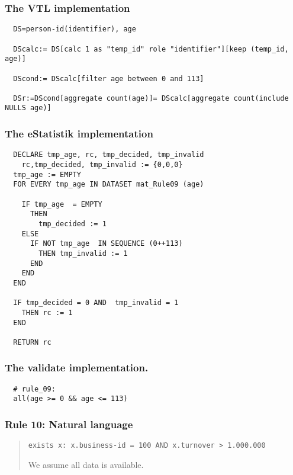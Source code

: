 \subsubsection*{The VTL implementation}
\begin{verbatim}
  DS=person-id(identifier), age

  DScalc:= DS[calc 1 as "temp_id" role "identifier"][keep (temp_id, age)]

  DScond:= DScalc[filter age between 0 and 113]

  DSr:=DScond[aggregate count(age)]= DScalc[aggregate count(include NULLS age)]

\end{verbatim}
\subsubsection*{The eStatistik implementation}
\begin{verbatim}
  DECLARE tmp_age, rc, tmp_decided, tmp_invalid
    rc,tmp_decided, tmp_invalid := {0,0,0}
  tmp_age := EMPTY
  FOR EVERY tmp_age IN DATASET mat_Rule09 (age)

    IF tmp_age  = EMPTY 
      THEN
        tmp_decided := 1 
    ELSE
      IF NOT tmp_age  IN SEQUENCE (0++113)
        THEN tmp_invalid := 1  
      END
    END
  END

  IF tmp_decided = 0 AND  tmp_invalid = 1
    THEN rc := 1
  END

  RETURN rc
\end{verbatim}
\subsubsection*{The validate implementation.}
\begin{verbatim}
  # rule_09:
  all(age >= 0 && age <= 113)
\end{verbatim}


\newpage

\subsubsection*{  Rule 10: Natural language}
\begin{quote}


\begin{verbatim}
exists x: x.business-id = 100 AND x.turnover > 1.000.000
\end{verbatim}

We assume all data is available.


\end{quote}
